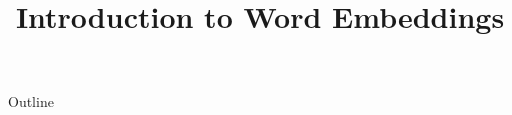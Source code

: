 \documentclass[xcolor=dvipsnames,compress,t,pdf,9pt]{beamer}
\title[\insertframenumber /\inserttotalframenumber]{Introduction to Word Embeddings}
\begin{document}
	\begin{frame}
	\titlepage
	\end{frame}
	
	\begin{frame}{Outline}
	    \tableofcontents
	\end{frame}

	
	

	
	
\end{document}
